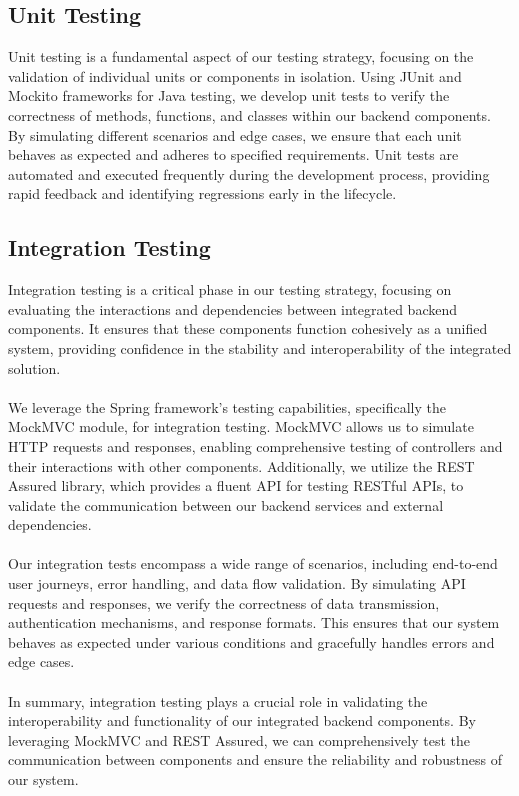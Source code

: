 \documentclass[12pt,a4paper]{report}
\begin{document}
\subsection{Unit Testing}

Unit testing is a fundamental aspect of our testing strategy, focusing on the validation of individual units or components in isolation. Using JUnit and Mockito frameworks for Java testing, we develop unit tests to verify the correctness of methods, functions, and classes within our backend components. By simulating different scenarios and edge cases, we ensure that each unit behaves as expected and adheres to specified requirements. Unit tests are automated and executed frequently during the development process, providing rapid feedback and identifying regressions early in the lifecycle.

\subsection{Integration Testing}

Integration testing is a critical phase in our testing strategy, focusing on evaluating the interactions and dependencies between integrated backend components. It ensures that these components function cohesively as a unified system, providing confidence in the stability and interoperability of the integrated solution.
\\\\
\noindent We leverage the Spring framework's testing capabilities, specifically the MockMVC module, for integration testing. MockMVC allows us to simulate HTTP requests and responses, enabling comprehensive testing of controllers and their interactions with other components. Additionally, we utilize the REST Assured library, which provides a fluent API for testing RESTful APIs, to validate the communication between our backend services and external dependencies.
\\\\
\noindent Our integration tests encompass a wide range of scenarios, including end-to-end user journeys, error handling, and data flow validation. By simulating API requests and responses, we verify the correctness of data transmission, authentication mechanisms, and response formats. This ensures that our system behaves as expected under various conditions and gracefully handles errors and edge cases.
\\\\
\noindent In summary, integration testing plays a crucial role in validating the interoperability and functionality of our integrated backend components. By leveraging MockMVC and REST Assured, we can comprehensively test the communication between components and ensure the reliability and robustness of our system.
\end{document}
